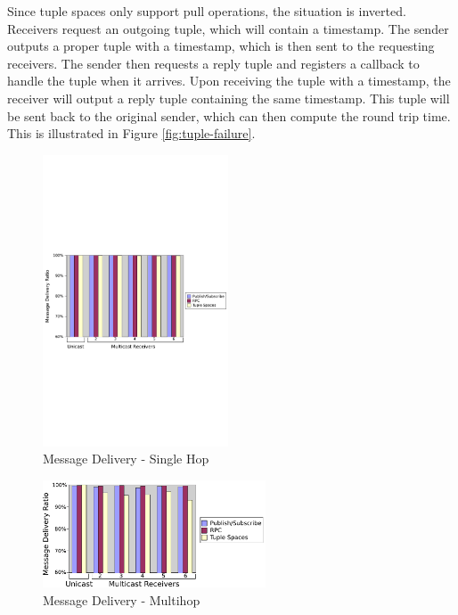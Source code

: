 Since tuple spaces only support pull operations, the situation is inverted. Receivers request an outgoing tuple, which will contain a timestamp. The sender outputs a proper tuple with a timestamp, which is then sent to the requesting receivers. The sender then requests a reply tuple and registers a callback to handle the tuple when it arrives. Upon receiving the tuple with a timestamp, the receiver will output a reply tuple containing the same timestamp. This tuple will be sent back to the original sender, which can then compute the round trip time. This is illustrated in Figure \ref{fig:tuple-failure}.

\begin{figure}
\centering
\includegraphics[width = 0.49\textwidth, clip, trim = 0px 400px 0px 400px]{figures/single-hop-group-delivery.pdf}
\caption{Message Delivery - Single Hop}
\label{fig:sgdel}
\end{figure}

\begin{figure}
\centering
\includegraphics[width = 0.59\textwidth, clip, trim = 0px 0px 0px 0px]{figures/multi-hop-group-delivery.pdf}
\caption{Message Delivery - Multihop}
\label{fig:mhgdel}
\end{figure}

